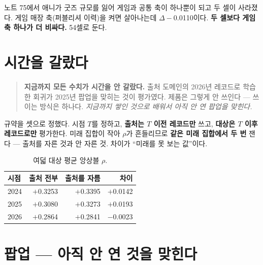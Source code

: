 \documentclass[10pt]{article}
\begin{document}

노트 75에서 애니가 굿즈 규모를 잃어 게임과 공통 축이 하나뿐이 되고 두 셀이
사라졌다. 게임 매장 축(퍼블리셔 이력)을 켜면 살아나는데 $\Delta-$0.0110이다.
\textbf{두 셀보다 게임 축 하나가 더 비싸다.} 54셀로 둔다.

\section{시간을 갈랐다}

\begin{quote}\fontsize{9.5}{11.5}\selectfont
\textbf{지금까지 모든 수치가 시간을 안 갈랐다.} 출처 도메인의 2026년 레코드로
학습한 회귀가 2025년 팝업을 맞히는 것이 평가였다. 제품은 그렇게 안 쓰인다 ---
쓰이는 방식은 하나다. \emph{지금까지 쌓인 것으로 배워서 아직 안 연 팝업을 맞힌다.}
\end{quote}

규약을 셋으로 정했다. 시점 $T$를 정하고, \textbf{출처는 $T$ 이전 레코드만}
쓰고, \textbf{대상은 $T$ 이후 레코드로만} 평가한다. 미래 집합이 작아 $\rho$가
흔들리므로 \textbf{같은 미래 집합에서 두 번} 잰다 --- 출처를 자른 것과 안 자른
것. 차이가 ``미래를 못 보는 값''이다.

\begin{table}[t]
\centering\tsize
\caption{여덟 대상 평균 앙상블 $\rho$.}
\begin{tabular}{lrrr}
\toprule
시점 & 출처 전부 & 출처를 자름 & 차이 \\
\midrule
2024 & $+$0.3253 & $+$0.3395 & $+$0.0142 \\
2025 & $+$0.3080 & $+$0.3273 & $+$0.0193 \\
2026 & $+$0.2864 & $+$0.2841 & $-$0.0023 \\
\bottomrule
\end{tabular}
\end{table}


\section{팝업 --- 아직 안 연 것을 맞힌다}
\end{document}

